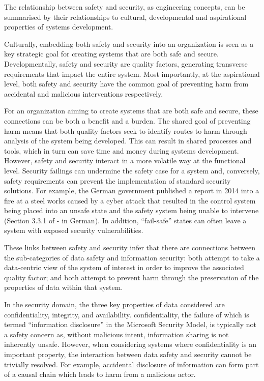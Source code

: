 The relationship between safety and security, as engineering concepts, can be summarised by their relationships to cultural, developmental and aspirational properties of systems development.

Culturally, embedding both safety and security into an organization is seen as a key strategic goal for creating systems that are both safe and secure. Developmentally, safety and security are quality factors, generating transverse requirements that impact the entire system. Most importantly, at the aspirational level, both safety and security have the common goal of preventing harm from accidental and malicious interventions respectively.

For an organization aiming to create systems that are both safe and secure, these connections can be both a benefit and a burden. The shared goal of preventing harm means that both quality factors seek to identify routes to harm through analysis of the system being developed. This can result in shared processes and tools, which in turn can save time and money during systems development. However, safety and security interact in a more volatile way at the functional level. Security failings can undermine the safety case for a system and, conversely, safety requirements can prevent the implementation of standard security solutions. For example, the German government published a report in 2014 into a fire at a steel works caused by a cyber attack that resulted in the control system being placed into an unsafe state and the safety system being unable to intervene (Section 3.3.1 of \cite{citation:DieLage} - in German). In addition, ``fail-safe'' states can often leave a system with exposed security vulnerabilities.

These links between safety and security infer that there are connections between the sub-categories of data safety and \gls{information} security: both attempt to take a data-centric view of the system of interest in order to improve the associated quality factor; and both attempt to prevent harm through the preservation of the properties of data within that system.

In the security domain, the three key properties of data considered are \gls{confidentiality}, \gls{integrity}, and \gls{availability}. \Gls{confidentiality}, the failure of which is termed ``\gls{information} disclosure'' in the Microsoft Security Model, \cite{citation:leblanc2002writing} is typically not a safety concern as, without malicious intent, \gls{information} sharing is not inherently unsafe. However, when considering systems where \gls{confidentiality} is an important property, the interaction between data safety and security cannot be trivially resolved. For example, accidental disclosure of \gls{information} can form part of a causal chain which leads to harm from a malicious actor.

